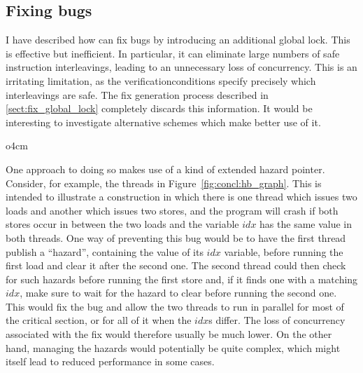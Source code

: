 \subsection{Fixing bugs}

I have described how {\technique} can fix bugs by introducing an
additional global lock.  This is effective but inefficient.  In
particular, it can eliminate large numbers of safe instruction
interleavings, leading to an unnecessary loss of concurrency.  This is
an irritating limitation, as the \glspl{verificationcondition} specify
precisely which interleavings are safe.  The fix generation process
described in \autoref{sect:fix_global_lock} completely discards this
information.  It would be interesting to investigate alternative
schemes which make better use of it.
  
\begin{wrapfigure}{o}{4cm}
  \vspace{-12pt}
  \vspace{-12pt}
\end{wrapfigure}
One approach to doing so makes use of a kind of extended hazard
pointer\cite{Michael2004}.  Consider, for example, the threads in
Figure~\ref{fig:concl:hb_graph}.  This is intended to illustrate a
construction in which there is one thread which issues two loads and
another which issues two stores, and the program will crash if both
stores occur in between the two loads and the variable $\mathit{idx}$
has the same value in both threads.  One way of preventing this bug
would be to have the first thread publish a ``hazard'', containing the
value of its $\mathit{idx}$ variable, before running the first load
and clear it after the second one.  The second thread could then check
for such hazards before running the first store and, if it finds one
with a matching $\mathit{idx}$, make sure to wait for the hazard to
clear before running the second one.  This would fix the bug and allow
the two threads to run in parallel for most of the critical section,
or for all of it when the $\mathit{idx}$s differ.  The loss of
concurrency associated with the fix would therefore usually be much
lower.  On the other hand, managing the hazards would potentially be
quite complex, which might itself lead to reduced performance in some
cases.

